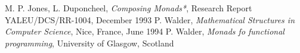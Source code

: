 \begin{thebibliography}{99}
   M. P. Jones, L. Duponcheel, \emph{Composing Monads*}, Research Report YALEU/DCS/RR-1004, December 1993
   P. Walder, \emph{Mathematical Structures in Computer Science}, Nice, France, June 1994
   P. Walder, \emph{Monads fo functional programming}, University of Glasgow, Scotland
\end{thebibliography}